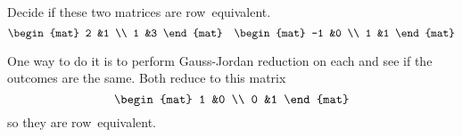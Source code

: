\documentclass[11pt]{examjh}
\begin{document}
\begin{questions}
\question
  Decide if these two matrices are row~equivalent.
  \begin{equation*}
    \begin{mat}
      2 &1  \\
      1 &3  
    \end{mat}\quad
    \begin{mat}
      -1 &0 \\
      1 &1 
    \end{mat}
  \end{equation*}
  \begin{solution}[2in]
    One way to do it is to
    perform Gauss-Jordan reduction on each and see if the outcomes
    are the same.
    Both reduce to this matrix
    \begin{equation*}
      \begin{mat}
        1 &0 \\
        0 &1
      \end{mat}
    \end{equation*}
    so they are row~equivalent.
  \end{solution}




\end{questions}
\end{document}
